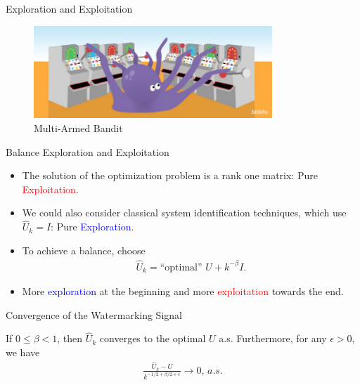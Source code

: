 \documentclass[10pt]{beamer}
\begin{document}
%
\begin{frame}{Exploration and Exploitation}
  \begin{figure}[ht]
    \centering
    \includegraphics[width=0.8\textwidth]{bandit.png}
    \caption{Multi-Armed Bandit}
  \end{figure}
\end{frame}

\begin{frame}{Balance Exploration and Exploitation}
  \begin{itemize}
    \item The solution of the optimization problem is a rank one matrix: Pure \textcolor{red}{Exploitation}.
    \item We could also consider classical system identification techniques, which use $\hat U_k=I$: Pure \textcolor{blue}{Exploration}.
    \item To achieve a balance, choose
      \begin{align*}
	\hat U_k = \text{``optimal'' } U + k^{-\beta} I.
      \end{align*}
    \item More \textcolor{blue}{exploration} at the beginning and more \textcolor{red}{exploitation} towards the end.
  \end{itemize}
\end{frame}

\begin{frame}{Convergence of the Watermarking Signal}
  \begin{theorem}
    If $0 \leq \beta < 1$, then $\hat U_k$ converges to the optimal $U$ a.s. Furthermore, for any $\epsilon > 0$, we have
    \begin{align*}
      \frac{\hat U_k - U}{k^{-1/2+\beta/2+\epsilon}} \rightarrow 0,\,a.s.
    \end{align*}
  \end{theorem}
\end{frame}
\end{document}
